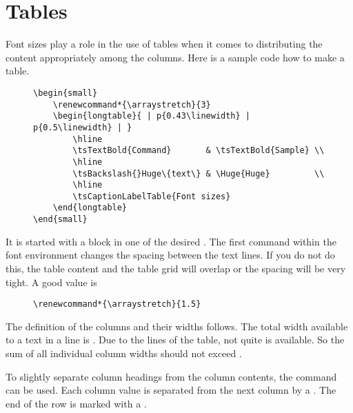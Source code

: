 \section{Tables}

Font sizes play a role in the use of tables when it comes to distributing
the content appropriately among the columns. Here is a sample code how to
make a table.

\begin{figure}[H]
    \small
    \centering
    \begin{BVerbatim}
\begin{small}
    \renewcommand*{\arraystretch}{3}
    \begin{longtable}{ | p{0.43\linewidth} | p{0.5\linewidth} | }
        \hline
        \tsTextBold{Command}       & \tsTextBold{Sample} \\
        \hline
        \tsBackslash{}Huge\{text\} & \Huge{Huge}         \\
        \hline
        \tsCaptionLabelTable{Font sizes}
    \end{longtable}
\end{small}
    \end{BVerbatim}
\end{figure}

It is started with a block in one of the desired .
The first command within the font environment changes the spacing between the
text lines. If you do not do this, the table content and the table grid will
overlap or the spacing will be very tight. A good value is

\begin{figure}[H]
    \small
    \centering
    \begin{BVerbatim}
\renewcommand*{\arraystretch}{1.5}
    \end{BVerbatim}
\end{figure}

The definition of the columns and their widths follows. The total width
available to a text in a line is . Due
to the lines of the table, not quite 
is available. So the sum of all individual column widths should not exceed
.
\bigbreak

To slightly separate column headings from the column contents, the\linebreak
{} command can be used. Each
column value is separated from the next column by a \tsTextMonospace{\&}. The end
of the row is marked with a \tsTextMonospace{\tsBackslash{}\tsBackslash{}}.
\bigbreak

